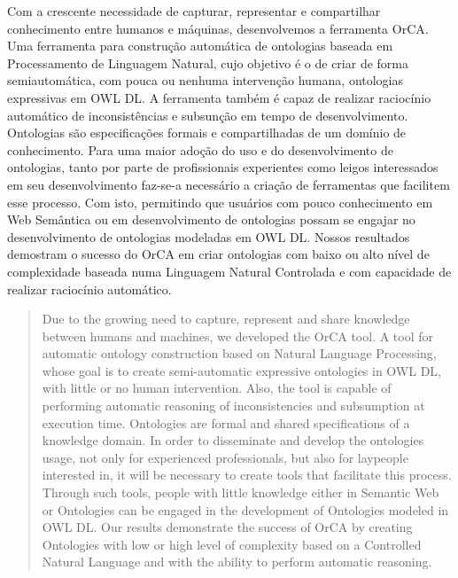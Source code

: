 \documentclass{bcc}
\begin{document}

\capa



\begin{resumo}

Com a crescente necessidade de capturar, representar e compartilhar conhecimento entre humanos e máquinas, desenvolvemos a ferramenta OrCA. Uma ferramenta para construção automática de ontologias baseada em Processamento de Linguagem Natural, cujo objetivo é o de criar de forma semiautomática, com pouca ou nenhuma intervenção humana, ontologias expressivas em OWL DL. A ferramenta também é capaz  de realizar raciocínio automático de inconsistências e subsunção em tempo de desenvolvimento. Ontologias são especificações formais e compartilhadas de um domínio de conhecimento. Para uma maior adoção do uso e do desenvolvimento de ontologias, tanto por parte de profissionais experientes como leigos interessados em seu desenvolvimento faz-se-a necessário a criação de ferramentas que facilitem esse processo. Com isto, permitindo que usuários com pouco conhecimento em Web Semântica ou em desenvolvimento de ontologias possam se engajar no desenvolvimento de ontologias modeladas em OWL DL. Nossos resultados demostram o sucesso do OrCA em criar ontologias com baixo ou alto nível de complexidade baseada numa Linguagem Natural Controlada e com capacidade de realizar raciocínio automático.

\end{resumo}


\begin{abstract}
Due to the growing need to capture, represent and share knowledge between humans and machines, we developed the OrCA tool. A tool for automatic ontology construction based on Natural Language Processing, whose goal is to create semi-automatic expressive ontologies in OWL DL, with little or no human intervention. Also, the tool is capable of performing automatic reasoning of inconsistencies and subsumption at execution time. Ontologies are formal and shared specifications of a knowledge domain. In order to disseminate and develop the ontologies usage, not only for experienced professionals, but also for laypeople interested in, it will be necessary to create tools that facilitate this process. Through such tools, people with little knowledge either in Semantic Web or Ontologies can be engaged in the development of Ontologies modeled in OWL DL. Our results demonstrate the success of OrCA by creating Ontologies with low or high level of complexity based on a Controlled Natural Language and with the ability to perform automatic reasoning.

\end{abstract}
\end{document}
